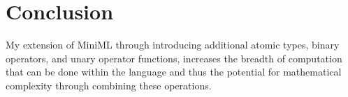 \documentclass{article}
\begin{document}
\section{Conclusion}
My extension of MiniML through introducing additional atomic types, binary operators, and unary operator functions, increases the breadth of computation that can be done within the language and thus the potential for mathematical complexity through combining these operations.
\end{document}
